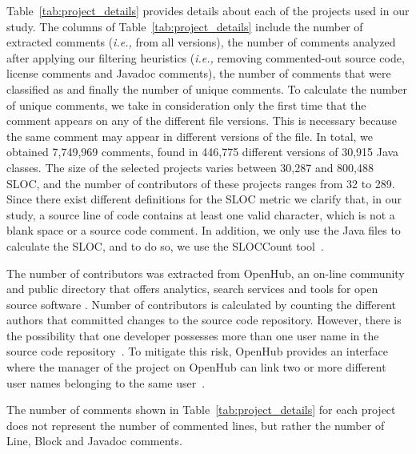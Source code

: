Table~\ref{tab:project_details} provides details about each of the projects used in our study. The columns of Table~\ref{tab:project_details} include the number of extracted comments (\textit{i.e.,} from all versions), the number of comments analyzed after applying our filtering heuristics (\textit{i.e.,} removing commented-out source code, license comments and Javadoc comments), the number of comments that were classified as \SATD and finally the number of unique \SATD comments. To calculate the number of unique \SATD comments, we take in consideration only the first time that the comment appears on any of the different file versions. This is necessary because the same comment may appear in different versions of the file. In total, we obtained 7,749,969 comments, found in 446,775 different versions of 30,915 Java classes. The size of the selected projects varies between 30,287 and 800,488 SLOC, and the number of contributors of these projects ranges from 32 to 289. Since there exist different definitions for the SLOC metric we clarify that, in our study, a source line of code contains at least one valid character, which is not a blank space or a source code comment. In addition, we only use the Java files to calculate the SLOC, and to do so, we use the SLOCCount tool~\cite{wheeler2004:home}. 

 
The number of contributors was extracted from OpenHub, an on-line community and public directory that offers analytics, search services and tools for open source software \cite{Openhub:home}. Number of contributors is calculated by counting the different authors that committed changes to the source code repository. However, there is the possibility that one developer possesses more than one user name in the source code repository~\cite{DBLP:conf/icsm/KoutersVSB12}. To mitigate this risk, OpenHub provides an interface where the manager of the project on OpenHub can link two or more different user names belonging to the same user~\cite{Openhub:Aliases}. 



The number of comments shown in Table~\ref{tab:project_details} for each project does not represent the number of commented lines, but rather the number of Line, Block and Javadoc comments. 



